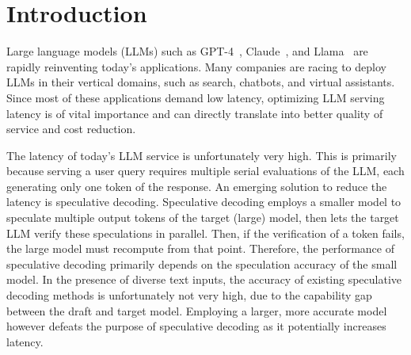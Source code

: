 \section{Introduction}

Large language models (LLMs) such as GPT-4~\citep{openai2023gpt}, Claude~\citep{bai2022training}, and Llama~\citep{touvron2023llama,touvron2023llama2} are rapidly reinventing today's applications. 
Many companies are racing to deploy LLMs in their vertical domains, such as search, chatbots, and virtual assistants. Since most of these applications demand low latency, optimizing LLM serving latency is of vital importance and can directly translate into better quality of service and cost reduction.

The latency of today's LLM service is unfortunately very high. This is primarily because serving a user query requires multiple serial evaluations of the LLM, each generating only one token of the response.
An emerging solution to reduce the latency is speculative decoding. Speculative decoding employs a smaller model to speculate multiple output tokens of the target (large) model, then lets the target LLM verify these speculations in parallel. Then, if the verification of a token fails, the large model must recompute from that point. Therefore, the performance of speculative decoding primarily depends on the speculation accuracy of the small model. In the presence of diverse text inputs, %
the accuracy of existing speculative decoding methods is unfortunately not very high, due to the capability gap between the draft and target model. Employing a larger, more accurate model however defeats the purpose of speculative decoding as it potentially increases latency.

